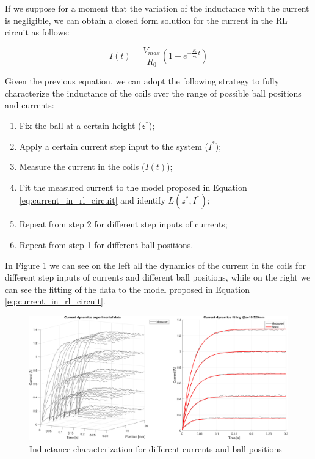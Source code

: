 If we suppose for a moment that the variation of the inductance with the current is negligible, we can obtain a closed form solution for the current in the RL circuit as follows:

\begin{equation}
    I(t) = \frac{V_{max}}{R_0} \left( 1 - e^{- \frac{R_0}{L_0} t} \right)
    \label{eq:current_in_rl_circuit}
\end{equation}

Given the previous equation, we can adopt the following strategy to fully characterize the inductance of the coils over the range of possible ball positions and currents:

\begin{enumerate}
    \item Fix the ball at a certain height ($z^*$);
    \item Apply a certain current step input to the system ($I^*$);
    \item Measure the current in the coils ($I(t)$);
    \item Fit the measured current to the model proposed in Equation \ref{eq:current_in_rl_circuit} and identify $L(z^*, I^*)$;
    \item Repeat from step 2 for different step inputs of currents;
    \item Repeat from step 1 for different ball positions.
\end{enumerate}

In Figure \ref{fig:inductance_characterization_currents} we can see on the left all the dynamics of the current in the coils for different step inputs of currents and different ball positions, while on the right we can see the fitting of the data to the model proposed in Equation \ref{eq:current_in_rl_circuit}.

\begin{figure}[H]
    \centering
    \includegraphics[width=1\textwidth]{img/MATLAB/identification/currents.pdf}
    \caption{Inductance characterization for different currents and ball positions}
    \label{fig:inductance_characterization_currents}
\end{figure}

